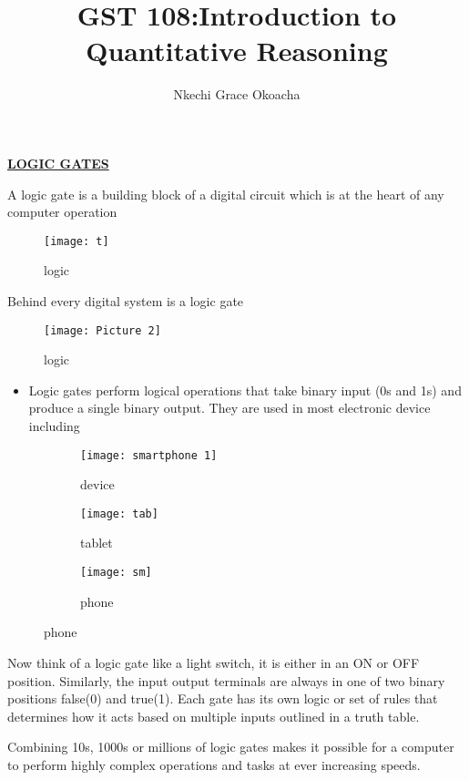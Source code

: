 \documentclass{article}
\title{GST 108:Introduction to Quantitative Reasoning}
\author{Nkechi Grace Okoacha}
\begin{document}
		\textbf{\underline{LOGIC GATES}}
	
	A logic gate is a building block of a digital circuit which is at the heart of any computer operation
	
	
\begin{figure}
	\centering
	\texttt{[image: t]}
	\caption{logic}
		\end{figure}
	
	Behind every digital system is a logic gate
	
	\begin{figure}
		\centering
		\texttt{[image: Picture 2]}
		\caption{logic}
	\end{figure}

		\begin{itemize}
			\item Logic gates perform logical operations that take binary input (0s and 1s) and produce  a single binary output. They are used in most electronic device including
			
		\end{itemize}
	
	\newpage
	
	\begin{figure}[h!]
		\centering
		\begin{subfigure}[b]{0.2\linewidth}
			
			\texttt{[image: smartphone 1]}
			\caption{device}\end{subfigure}
		\begin{subfigure}[b]{0.2\linewidth}
			\texttt{[image: tab]}
			\caption{tablet}
		\end{subfigure}
		\begin{subfigure}[b]{0.2\linewidth}
			\texttt{[image: sm]}
			\caption{phone}
		\end{subfigure}

	
	\end{figure}

Now think of a logic gate like a light switch, it is either in an ON or OFF position. Similarly, the input output terminals are always in one of two binary positions false(0) and true(1). Each gate has its own logic or set of rules that determines how it acts based on multiple inputs outlined in a truth table.

Combining 10s, 1000s or millions of logic gates makes it possible for a computer to perform highly complex operations and tasks at ever increasing speeds.
\end{document}
